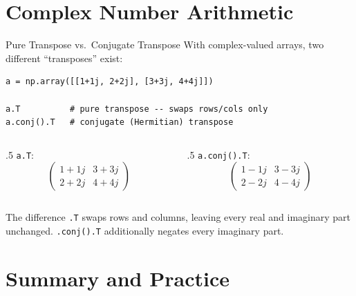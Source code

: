 \documentclass[9pt,aspectratio=169,xcolor=table]{beamer}
\begin{document}
\section{Complex Number Arithmetic}

\begin{frame}[fragile]{Pure Transpose vs.\ Conjugate Transpose}
    \leavevmode
    With complex-valued arrays, two different ``transposes'' exist:

\begin{lstlisting}
a = np.array([[1+1j, 2+2j], [3+3j, 4+4j]])

a.T          # pure transpose -- swaps rows/cols only
a.conj().T   # conjugate (Hermitian) transpose
\end{lstlisting}

    \begin{columns}[t]
        \begin{column}{.5\textwidth}
            \texttt{a.T}:
            \[
            \begin{pmatrix} 1{+}1j & 3{+}3j \\ 2{+}2j & 4{+}4j \end{pmatrix}
            \]
        \end{column}
        \begin{column}{.5\textwidth}
            \texttt{a.conj().T}:
            \[
            \begin{pmatrix} 1{-}1j & 3{-}3j \\ 2{-}2j & 4{-}4j \end{pmatrix}
            \]
        \end{column}
    \end{columns}

    \vspace{2mm}
    \begin{alertblock}{The difference}
        \texttt{.T} swaps rows and columns, leaving every real and
        imaginary part unchanged. \texttt{.conj().T} \alert{additionally}
        negates every imaginary part.
    \end{alertblock}
\end{frame}

\section{Summary and Practice}
\end{document}
